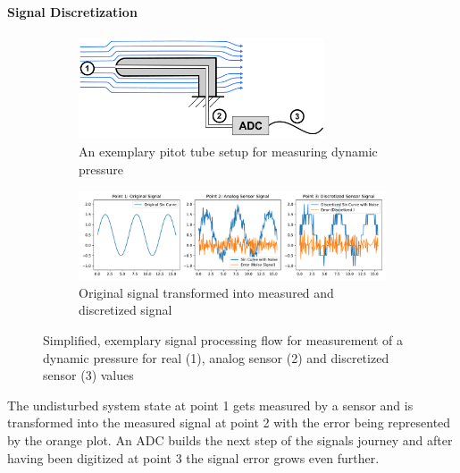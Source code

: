 \paragraph{Signal Discretization}





\begin{figure}[!h]
    \centering
    \begin{subfigure}{\textwidth}
        \centering
        \includegraphics[width=0.8\textwidth]{03_figures/signal_recording}
        \caption{An exemplary pitot tube setup for measuring dynamic pressure}
        \label{fig:signal_processing_setup}
    \end{subfigure}
    \begin{subfigure}{\textwidth}
        \centering
        \includegraphics[width=\textwidth]{03_figures/python_functions/images/signal_processing_plots}
        \caption{Original signal transformed into measured and discretized signal}
        \label{fig:signal_processing_plots}
    \end{subfigure}
    \caption{Simplified, exemplary signal processing flow for measurement of a dynamic pressure for real (1), analog sensor (2) and discretized sensor (3) values}
    \label{fig:signal_processing}
\end{figure}


The undisturbed system state at point 1 gets measured by a sensor and is transformed into the measured signal at point 2 with the error being represented by the orange plot. An ADC builds the next step of the signals journey and after having been digitized at point 3 the signal error grows even further.


